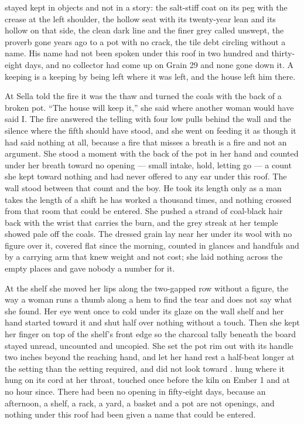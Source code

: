  stayed kept in objects and not in a story: the salt-stiff coat on its peg with the crease at the left shoulder, the hollow seat with its twenty-year lean and its hollow on that side, the clean dark line and the finer grey called  unswept, the proverb gone years ago to a pot with no crack, the tile debt circling without a name. His name had not been spoken under this roof in two hundred and thirty-eight days, and no collector had come up  on Grain 29 and none gone down it. A keeping is a keeping by being left where it was left, and the house left him there.

At  Sella told the fire it was the thaw and turned the coals with the back of a broken pot. “The house will keep it,” she said where another woman would have said I. The fire answered the telling with four low pulls behind the wall and the silence where the fifth should have stood, and she went on feeding it as though it had said nothing at all, because a fire that misses a breath is a fire and not an argument. She stood a moment with the back of the pot in her hand and counted under her breath toward no opening --- small intake, hold, letting go --- a count she kept toward nothing and had never offered to any ear under this roof. The wall stood between that count and the boy. He took its length only as a man takes the length of a shift he has worked a thousand times, and nothing crossed from that room that could be entered. She pushed a strand of coal-black hair back with the wrist that carries the burn, and the grey streak at her temple showed pale off the coals. The dressed grain lay near her under its wool with no figure over it, covered flat since the morning, counted in glances and handfuls and by a carrying arm that knew weight and not cost; she laid nothing across the empty places and gave nobody a number for it.

At the shelf she moved her lips along the two-gapped row without a figure, the way a woman runs a thumb along a hem to find the tear and does not say what she found. Her eye went once to  cold under its glaze on the wall shelf and her hand started toward it and shut half over nothing without a touch. Then she kept her finger on top of the shelf's front edge so the charcoal tally beneath the board stayed unread, uncounted and uncopied. She set the pot rim out with its handle two inches beyond the reaching hand, and let her hand rest a half-beat longer at the setting than the setting required, and did not look toward .  hung where it hung on its cord at her throat, touched once before the kiln on Ember 1 and at no hour since. There had been no opening in fifty-eight days, because an afternoon, a shelf, a rack, a yard, a basket and a pot are not openings, and nothing under this roof had been given a name that could be entered.

